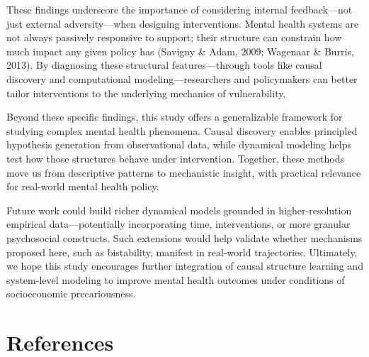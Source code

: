 \documentclass[
]{article}
\begin{document}
These findings underscore the importance of considering internal
feedback---not just external adversity---when designing interventions.
Mental health systems are not always passively responsive to support;
their structure can constrain how much impact any given policy has
(Savigny \& Adam, 2009; Wagenaar \& Burris, 2013). By diagnosing these
structural features---through tools like causal discovery and
computational modeling---researchers and policymakers can better tailor
interventions to the underlying mechanics of vulnerability.

Beyond these specific findings, this study offers a generalizable
framework for studying complex mental health phenomena. Causal discovery
enables principled hypothesis generation from observational data, while
dynamical modeling helps test how those structures behave under
intervention. Together, these methods move us from descriptive patterns
to mechanistic insight, with practical relevance for real-world mental
health policy.

Future work could build richer dynamical models grounded in
higher-resolution empirical data---potentially incorporating time,
interventions, or more granular psychosocial constructs. Such extensions
would help validate whether mechanisms proposed here, such as
bistability, manifest in real-world trajectories. Ultimately, we hope
this study encourages further integration of causal structure learning
and system-level modeling to improve mental health outcomes under
conditions of socioeconomic precariousness.

\section{References}\label{references}
\end{document}
